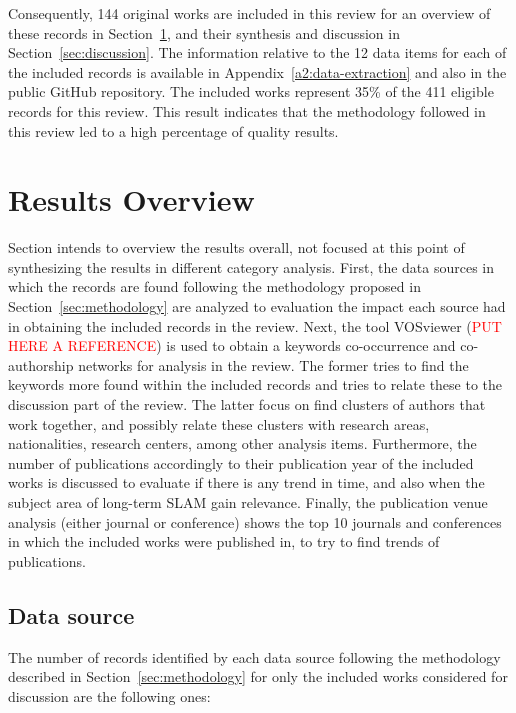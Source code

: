 \documentclass[10pt,a4paper,notitlepage,twocolumn,oneside]{article}
\begin{document}
Consequently, 144 original works are included in this review for an overview of these records in Section~\ref{sec:results}, and their synthesis and discussion in Section~\ref{sec:discussion}. The information relative to the 12 data items for each of the included records is available in Appendix~\ref{a2:data-extraction} and also in the public GitHub repository. The included works represent 35\% of the 411 eligible records for this review. This result indicates that the methodology followed in this review led to a high percentage of quality results.

\section{Results Overview}
\label{sec:results}

Section intends to overview the results overall, not focused at this point of synthesizing the results in different category analysis. First, the data sources in which the records are found following the methodology proposed in Section~\ref{sec:methodology} are analyzed to evaluation the impact each source had in obtaining the included records in the review. Next, the tool VOSviewer (\textcolor{red}{PUT HERE A  REFERENCE}) is used to obtain a keywords co-occurrence and co-authorship networks for analysis in the review. The former tries to find the keywords more found within the included records and tries to relate these to the discussion part of the review. The latter focus on find clusters of authors that work together, and possibly relate these clusters with research areas, nationalities, research centers, among other analysis items. Furthermore, the number of publications accordingly to their publication year of the included works is discussed to evaluate if there is any trend in time, and also when the subject area of long-term SLAM gain relevance. Finally, the publication venue analysis (either journal or conference) shows the top 10 journals and conferences in which the included works were published in, to try to find trends of publications.

\subsection{Data source}

The number of records identified by each data source following the methodology described in Section~\ref{sec:methodology} for only the included works considered for discussion are the following ones:
\end{document}

